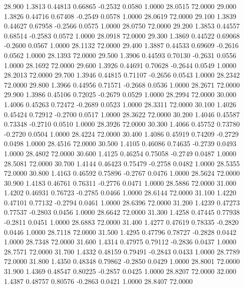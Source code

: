   28.900   1.3813   0.44813   0.66865  -0.2532   0.0580   1.0000  28.0515  72.0000
  29.000   1.3826   0.44716   0.67408  -0.2549   0.0578   1.0000  28.0619  72.0000
  29.100   1.3839   0.44627   0.67958  -0.2566   0.0575   1.0000  28.0750  72.0000
  29.200   1.3853   0.44557   0.68514  -0.2583   0.0572   1.0000  28.0918  72.0000
  29.300   1.3869   0.44522   0.69068  -0.2600   0.0567   1.0000  28.1132  72.0000
  29.400   1.3887   0.44533   0.69609  -0.2616   0.0562   1.0000  28.1393  72.0000
  29.500   1.3906   0.44593   0.70130  -0.2631   0.0556   1.0000  28.1692  72.0000
  29.600   1.3926   0.44691   0.70628  -0.2644   0.0549   1.0000  28.2013  72.0000
  29.700   1.3946   0.44815   0.71107  -0.2656   0.0543   1.0000  28.2342  72.0000
  29.800   1.3966   0.44956   0.71571  -0.2668   0.0536   1.0000  28.2671  72.0000
  29.900   1.3986   0.45106   0.72025  -0.2679   0.0529   1.0000  28.2994  72.0000
  30.000   1.4006   0.45263   0.72472  -0.2689   0.0523   1.0000  28.3311  72.0000
  30.100   1.4026   0.45424   0.72912  -0.2700   0.0517   1.0000  28.3622  72.0000
  30.200   1.4046   0.45587   0.73348  -0.2710   0.0510   1.0000  28.3926  72.0000
  30.300   1.4066   0.45752   0.73780  -0.2720   0.0504   1.0000  28.4224  72.0000
  30.400   1.4086   0.45919   0.74209  -0.2729   0.0498   1.0000  28.4516  72.0000
  30.500   1.4105   0.46086   0.74635  -0.2739   0.0493   1.0000  28.4802  72.0000
  30.600   1.4125   0.46254   0.75058  -0.2749   0.0487   1.0000  28.5081  72.0000
  30.700   1.4144   0.46423   0.75479  -0.2758   0.0482   1.0000  28.5355  72.0000
  30.800   1.4163   0.46592   0.75896  -0.2767   0.0476   1.0000  28.5624  72.0000
  30.900   1.4183   0.46761   0.76311  -0.2776   0.0471   1.0000  28.5886  72.0000
  31.000   1.4202   0.46931   0.76723  -0.2785   0.0466   1.0000  28.6144  72.0000
  31.100   1.4220   0.47101   0.77132  -0.2794   0.0461   1.0000  28.6396  72.0000
  31.200   1.4239   0.47273   0.77537  -0.2803   0.0456   1.0000  28.6642  72.0000
  31.300   1.4258   0.47445   0.77938  -0.2811   0.0451   1.0000  28.6883  72.0000
  31.400   1.4277   0.47619   0.78335  -0.2820   0.0446   1.0000  28.7118  72.0000
  31.500   1.4295   0.47796   0.78727  -0.2828   0.0442   1.0000  28.7348  72.0000
  31.600   1.4314   0.47975   0.79112  -0.2836   0.0437   1.0000  28.7571  72.0000
  31.700   1.4332   0.48159   0.79491  -0.2843   0.0433   1.0000  28.7789  72.0000
  31.800   1.4350   0.48348   0.79862  -0.2850   0.0429   1.0000  28.8001  72.0000
  31.900   1.4369   0.48547   0.80225  -0.2857   0.0425   1.0000  28.8207  72.0000
  32.000   1.4387   0.48757   0.80576  -0.2863   0.0421   1.0000  28.8407  72.0000
